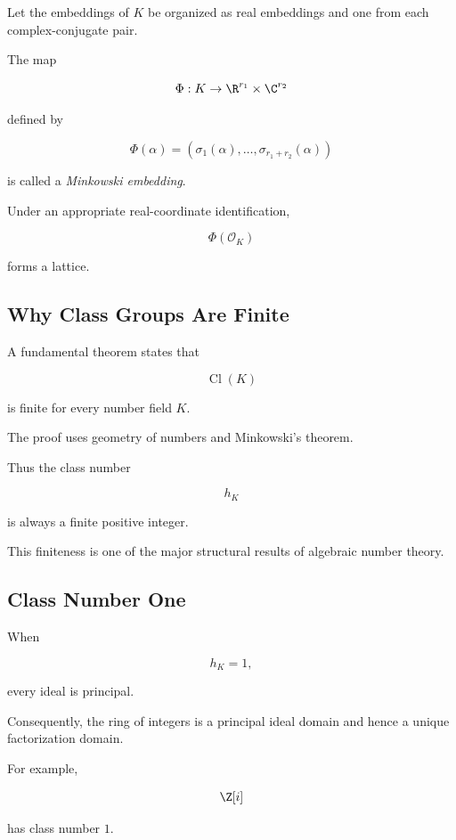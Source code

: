 Let the embeddings of \(K\) be organized as real embeddings and one from
each complex-conjugate pair.

The map

\[
\Phi:K\to\R^{r_1}\times\C^{r_2}
\]

defined by

\[
\Phi(\alpha)
=
\left(
\sigma_1(\alpha),\ldots,\sigma_{r_1+r_2}(\alpha)
\right)
\]

is called a \emph{Minkowski embedding}.

Under an appropriate real-coordinate identification,

\[ \Phi(\mathcal O_K) \]

forms a lattice.

\subsection{Why Class Groups Are Finite}
\label{subsec:class-group-finiteness}

A fundamental theorem states that

\[ \operatorname{Cl}(K) \]

is finite for every number field \(K\).

The proof uses geometry of numbers and Minkowski's theorem.

Thus the class number

\[ h_K \]

is always a finite positive integer.

This finiteness is one of the major structural results of algebraic number
theory.

\subsection{Class Number One}
\label{subsec:class-number-one}

When

\[ h_K=1, \]

every ideal is principal.

Consequently, the ring of integers is a principal ideal domain and hence a
unique factorization domain.

For example,

\[ \Z[i] \]

has class number \(1\).

